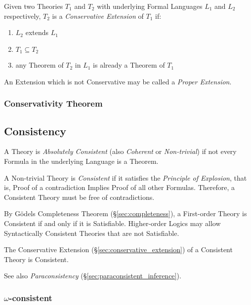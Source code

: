 Given two Theories $T_1$ and $T_2$ with underlying Formal Languages
$L_1$ and $L_2$ respectively, $T_2$ is a \emph{Conservative Extension}
of $T_1$ if:
\begin{enumerate}
  \item $L_2$ extends $L_1$
  \item $T_1 \subseteq T_2$
  \item any Theorem of $T_2$ in $L_1$ is already a Theorem of $T_1$
\end{enumerate}
An Extension which is not Conservative may be called a \emph{Proper
  Extension}.



\subsubsection{Conservativity Theorem}\label{sec:conservativity_theorem}



\subsection{Consistency}\label{sec:consistency}

A Theory is \emph{Absolutely Consistent} (also \emph{Coherent} or
\emph{Non-trivial}) if not every Formula in the underlying Language is
a Theorem.

A Non-trivial Theory is \emph{Consistent} if it satisfies the
\emph{Principle of Explosion}, that is, Proof of a contradiction
Implies Proof of all other Formulas. Therefore, a Consistent Theory must
be free of contradictions.

By G\"odels Completeness Theorem (\S\ref{sec:completeness}), a
First-order Theory is Consistent if and only if it is Satisfiable.
Higher-order Logics may allow Syntactically Consistent Theories that
are not Satisfiable.

The Conservative Extension (\S\ref{sec:conservative_extension}) of a
Consistent Theory is Consistent.

See also \emph{Paraconsistency} (\S\ref{sec:paraconsistent_inference}).



\subsubsection{$\omega$-consistent}\label{sec:omega_consistent}

